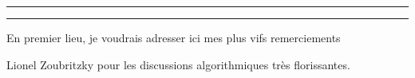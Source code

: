 
\begin{otherlanguage}{french}

\hrule\relax
\vspace*{.9\baselineskip}%
\raggedright{\huge{}}\par%
\vspace*{1.1\baselineskip}%
\hrule\relax
\vspace*{\baselineskip}%
\thispagestyle{empty}

\begingroup
\itshape

En premier lieu, je voudrais adresser ici mes plus vifs remerciements 


Lionel Zoubritzky pour les discussions algorithmiques très florissantes.

\endgroup

\clearpage
\mbox{}
\thispagestyle{empty}
\clearpage

%
%
%
%
%
%
%

\end{otherlanguage}
